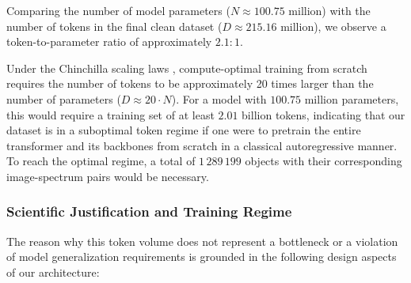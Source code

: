 Comparing the number of model parameters ($N \approx 100.75$ million) with the number of tokens in the final clean dataset ($D \approx 215.16$ million), we observe a token-to-parameter ratio of approximately $2.1:1$.

Under the Chinchilla scaling laws \autocite{ar:hoffmann-2022}, compute-optimal training from scratch requires the number of tokens to be approximately 20 times larger than the number of parameters ($D \approx 20 \cdot N$). For a model with $100.75$ million parameters, this would require a training set of at least $2.01$ billion tokens, indicating that our dataset is in a suboptimal token regime if one were to pretrain the entire transformer and its backbones from scratch in a classical autoregressive manner. To reach the optimal regime, a total of $1\,289\,199$ objects with their corresponding image-spectrum pairs would be necessary.

\subsubsection{Scientific Justification and Training Regime}

The reason why this token volume does not represent a bottleneck or a violation of model generalization requirements is grounded in the following design aspects of our architecture:

